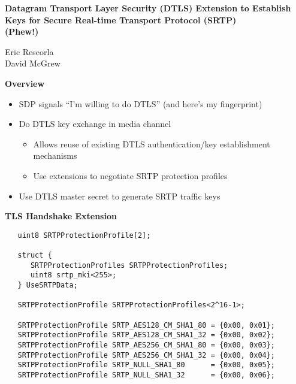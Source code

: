 \documentclass[helvetica,fancybox,landscape]{seminar}
\newcommand{\heading}[1]{%
  \begin{center} 
    \large\bf 
    #1 
  \end{center} 
  \vspace{.4 in}}
\begin{document}
\begin{slide}
\begin{center} 
\LARGE{{\bf Datagram Transport Layer Security
    (DTLS) Extension to Establish Keys for Secure Real-time Transport Protocol
    (SRTP)\\ (Phew!)}}
\end{center} 
\begin{center}
\vspace{.3 in} 
\large{Eric Rescorla}\\
\large{David McGrew}\\
\end{center}
\end{slide}


\begin{slide}
\heading{Overview}

\begin{itemize}
\item SDP signals ``I'm willing to do DTLS'' (and here's my fingerprint)
\item Do DTLS key exchange in media channel
\begin{itemize}
\item Allows reuse of existing DTLS authentication/key establishment mechanisms
\item Use extensions to negotiate SRTP protection profiles
\end{itemize}
\item Use DTLS master secret to generate SRTP traffic keys
\end{itemize}

\end{slide}

\begin{slide}
\heading{TLS Handshake Extension}

\newcommand{\protocolfont}{%
 \bfseries
 \fontsize{8pt}{8pt}\selectfont}

{\protocolfont
\begin{verbatim}
   uint8 SRTPProtectionProfile[2];

   struct {
      SRTPProtectionProfiles SRTPProtectionProfiles;
      uint8 srtp_mki<255>;
   } UseSRTPData;

   SRTPProtectionProfile SRTPProtectionProfiles<2^16-1>;

   SRTPProtectionProfile SRTP_AES128_CM_SHA1_80 = {0x00, 0x01};
   SRTPProtectionProfile SRTP_AES128_CM_SHA1_32 = {0x00, 0x02};
   SRTPProtectionProfile SRTP_AES256_CM_SHA1_80 = {0x00, 0x03};
   SRTPProtectionProfile SRTP_AES256_CM_SHA1_32 = {0x00, 0x04};
   SRTPProtectionProfile SRTP_NULL_SHA1_80      = {0x00, 0x05};
   SRTPProtectionProfile SRTP_NULL_SHA1_32      = {0x00, 0x06};
\end{verbatim}
}
\end{slide}
\end{document}
